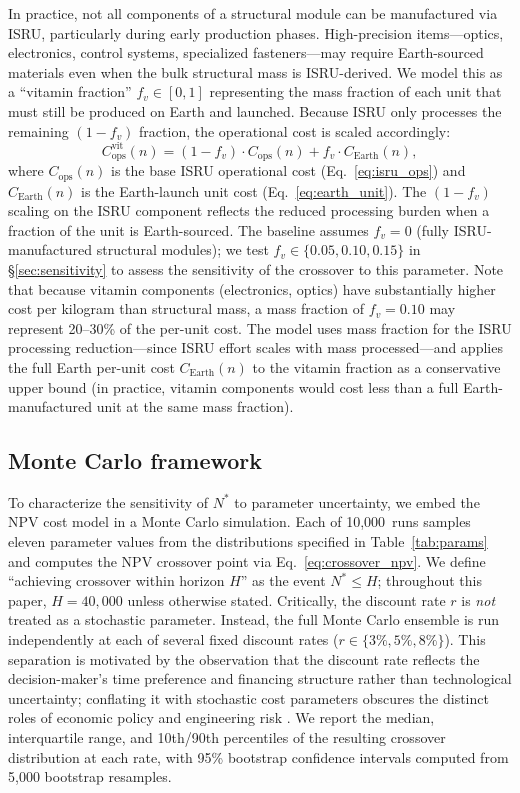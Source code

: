 \documentclass[preprint,12pt]{elsarticle}
\begin{document}
In practice, not all components of a structural module can be manufactured via ISRU, particularly during early production phases. High-precision items---optics, electronics, control systems, specialized fasteners---may require Earth-sourced materials even when the bulk structural mass is ISRU-derived. We model this as a ``vitamin fraction'' $f_v \in [0, 1]$ representing the mass fraction of each unit that must still be produced on Earth and launched. Because ISRU only processes the remaining $(1 - f_v)$ fraction, the operational cost is scaled accordingly:
\begin{equation}
  C_{\mathrm{ops}}^{\mathrm{vit}}(n) = (1 - f_v) \cdot C_{\mathrm{ops}}(n) + f_v \cdot C_{\mathrm{Earth}}(n),
  \label{eq:vitamin}
\end{equation}
where $C_{\mathrm{ops}}(n)$ is the base ISRU operational cost (Eq.~\ref{eq:isru_ops}) and $C_{\mathrm{Earth}}(n)$ is the Earth-launch unit cost (Eq.~\ref{eq:earth_unit}). The $(1 - f_v)$ scaling on the ISRU component reflects the reduced processing burden when a fraction of the unit is Earth-sourced. The baseline assumes $f_v = 0$ (fully ISRU-manufactured structural modules); we test $f_v \in \{0.05, 0.10, 0.15\}$ in \S\ref{sec:sensitivity} to assess the sensitivity of the crossover to this parameter. Note that because vitamin components (electronics, optics) have substantially higher cost per kilogram than structural mass, a mass fraction of $f_v = 0.10$ may represent 20--30\% of the per-unit cost. The model uses mass fraction for the ISRU processing reduction---since ISRU effort scales with mass processed---and applies the full Earth per-unit cost $C_{\mathrm{Earth}}(n)$ to the vitamin fraction as a conservative upper bound (in practice, vitamin components would cost less than a full Earth-manufactured unit at the same mass fraction).

\subsection{Monte Carlo framework}

To characterize the sensitivity of $N^*$ to parameter uncertainty, we embed the NPV cost model in a Monte Carlo simulation. Each of 10{,}000~runs samples eleven parameter values from the distributions specified in Table~\ref{tab:params} and computes the NPV crossover point via Eq.~\ref{eq:crossover_npv}. We define ``achieving crossover within horizon $H$'' as the event $N^* \leq H$; throughout this paper, $H = 40{,}000$ unless otherwise stated. Critically, the discount rate $r$ is \emph{not} treated as a stochastic parameter. Instead, the full Monte Carlo ensemble is run independently at each of several fixed discount rates ($r \in \{3\%, 5\%, 8\%\}$). This separation is motivated by the observation that the discount rate reflects the decision-maker's time preference and financing structure rather than technological uncertainty; conflating it with stochastic cost parameters obscures the distinct roles of economic policy and engineering risk \cite{arrow2014}. We report the median, interquartile range, and 10th/90th percentiles of the resulting crossover distribution at each rate, with 95\% bootstrap confidence intervals computed from 5{,}000 bootstrap resamples.
\end{document}
